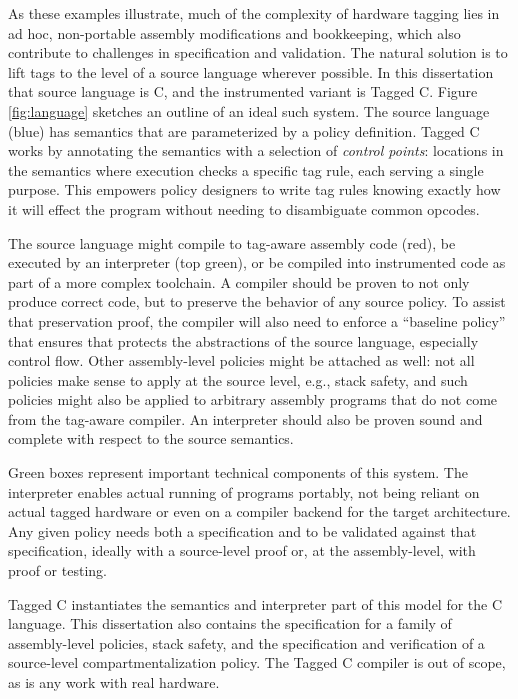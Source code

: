 As these examples illustrate, much of the complexity of hardware tagging lies in ad hoc,
non-portable assembly modifications and bookkeeping, which also contribute to challenges in
specification and validation. The natural solution is to lift
tags to the level of a source language wherever possible. In this dissertation that source language is C,
and the instrumented variant is Tagged C. Figure \ref{fig:language}
sketches an outline of an ideal such system. The source language (blue) has semantics that are
parameterized by a policy definition. Tagged C works by annotating the
semantics with a selection of {\em control points}: locations
in the semantics where execution checks a specific tag rule, each serving a single purpose.
This empowers policy designers to write tag rules knowing exactly how it will effect the
program without needing to disambiguate common opcodes.

The source language might compile to tag-aware assembly code (red), be executed by an
interpreter (top green), or be compiled into instrumented code as part of a more
complex toolchain. A compiler should be proven to not only
produce correct code, but to preserve the behavior of any source policy. To assist that preservation
proof, the compiler will also need to enforce a ``baseline policy'' that ensures that protects the
abstractions of the source language, especially control flow. Other assembly-level policies might be
attached as well: not all policies make sense to apply at the source level, e.g., stack safety, and
such policies might also be applied to arbitrary assembly programs that do not come from the tag-aware
compiler. An interpreter should also be proven sound and complete with respect to the source semantics.

Green boxes represent important technical components of this system. The interpreter enables
actual running of programs portably, not being reliant on actual
tagged hardware or even on a compiler backend for the target architecture.
Any given policy needs both a specification and to be validated against that specification,
ideally with a source-level proof or, at the assembly-level, with proof or testing.

Tagged C instantiates the semantics and interpreter part of this model for the C language.
This dissertation also contains the specification for a family of assembly-level policies,
stack safety, and the specification and verification of a source-level compartmentalization
policy. The Tagged C compiler is out of scope, as is any work with real hardware.

